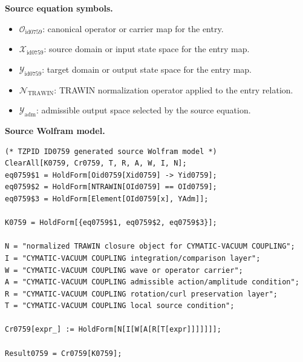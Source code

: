 \begin{minipage}[t]{0.49\linewidth}
\begingroup
\small
\raggedright
\textbf{Source equation symbols.}\par
\begin{itemize}[leftmargin=1.35em,itemsep=1pt,topsep=1pt,parsep=0pt]
    \item $\mathcal{O}_{\mathrm{id0759}}$: canonical operator or carrier map for the entry.
    \item $\mathcal{X}_{\mathrm{id0759}}$: source domain or input state space for the entry map.
    \item $\mathcal{Y}_{\mathrm{id0759}}$: target domain or output state space for the entry map.
    \item $\mathcal{N}_{\mathrm{TRAWIN}}$: TRAWIN normalization operator applied to the entry relation.
    \item $\mathcal{Y}_{\mathrm{adm}}$: admissible output space selected by the source equation.
\end{itemize}
\endgroup
\end{minipage}\hfill
\begin{minipage}[t]{0.47\linewidth}
\begingroup
\scriptsize
\raggedright
\textbf{Source Wolfram model.}\par
\begin{Verbatim}[fontsize=\tiny,breaklines=true,breakanywhere=true]
(* TZPID ID0759 generated source Wolfram model *)
ClearAll[K0759, Cr0759, T, R, A, W, I, N];
eq0759$1 = HoldForm[Oid0759[Xid0759] -> Yid0759];
eq0759$2 = HoldForm[NTRAWIN[OId0759] == OId0759];
eq0759$3 = HoldForm[Element[OId0759[x], YAdm]];

K0759 = HoldForm[{eq0759$1, eq0759$2, eq0759$3}];

N = "normalized TRAWIN closure object for CYMATIC-VACUUM COUPLING";
I = "CYMATIC-VACUUM COUPLING integration/comparison layer";
W = "CYMATIC-VACUUM COUPLING wave or operator carrier";
A = "CYMATIC-VACUUM COUPLING admissible action/amplitude condition";
R = "CYMATIC-VACUUM COUPLING rotation/curl preservation layer";
T = "CYMATIC-VACUUM COUPLING local source condition";

Cr0759[expr_] := HoldForm[N[I[W[A[R[T[expr]]]]]]];

Result0759 = Cr0759[K0759];
\end{Verbatim}
\endgroup
\end{minipage}

